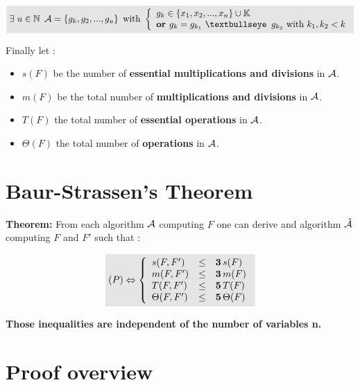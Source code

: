 $$
\begin{equation}
\colbox{
\label{algo}
\exists\,\, u \in \mathbb{N} \,\,\, \A = \left\{ g_k,g_2,...,g_u \right\}
\textrm{ with }
   \left \{
   \begin{array}{l}
       g_k \in \left\{x_1,x_2,...,x_n\right\} \cup \mathbb{K}\\
       \textrm{\textbf{or }} g_k = g_{k_1} \textrm{ \textbullseye\, } g_{k_2}\textrm{ with }k_1,k_2 < k
   \end{array}
   \right .
}
\end{equation}
$$

Finally let :

\begin{itemize}
\item $s(F)$ be the number of \textbf{essential multiplications and divisions} in $\mathcal{A}$.
    \item $m(F)$ be the total number of \textbf{multiplications and divisions} in $\mathcal{A}$.
    \item $T(F)$ the total number of \textbf{essential operations} in $\mathcal{A}$.
    \item $\Theta(F)$ the total number of \textbf{operations} in $\mathcal{A}$.
\end{itemize}

\section{Baur-Strassen's Theorem}
\textbf{Theorem:} From each algorithm $\mathcal{A}$ computing $F$ one can derive and algorithm $\mathring{\mathcal{A}}$ computing $F$ and $F'$ such that :


$$
\begin{equation}
    \label{SB}
    \colbox{
    (P) \Leftrightarrow
   \left \{
   \begin{array}{l c l}
       s(F,F') &\leq & \mathbf{3} \,s(F)\\
       m(F,F') &\leq & \mathbf{3} \,m(F)\\
       T(F,F') &\leq & \mathbf{5} \,T(F)\\
       \Theta(F,F') &\leq & \mathbf{5} \,\Theta(F)
   \end{array}
   \right .
}
\end{equation}
$$

\vskip 0.5cm
\textbf{Those inequalities are independent of the number of variables n.}

\section{Proof overview}

